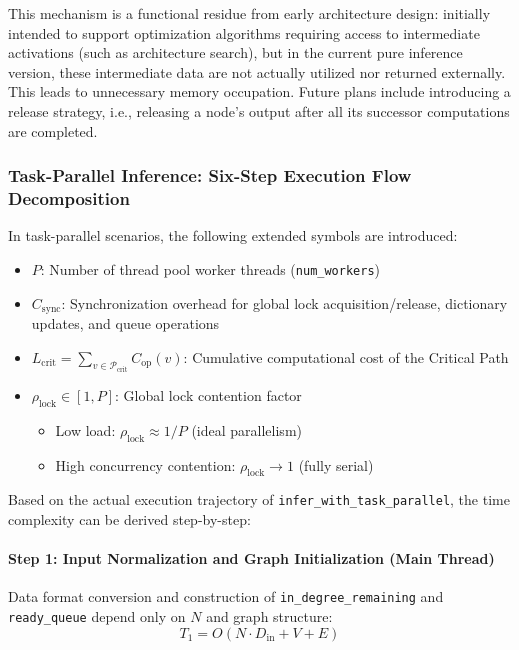 This mechanism is a functional residue from early architecture design: initially intended to support optimization algorithms requiring access to intermediate activations (such as architecture search), but in the current pure inference version, these intermediate data are not actually utilized nor returned externally. This leads to unnecessary memory occupation. Future plans include introducing a release strategy, i.e., releasing a node's output after all its successor computations are completed.

\subsubsection{Task-Parallel Inference: Six-Step Execution Flow Decomposition}

In task-parallel scenarios, the following extended symbols are introduced:
\begin{itemize}
    \item $P$: Number of thread pool worker threads (\texttt{num\_workers})
    \item $C_{\mathrm{sync}}$: Synchronization overhead for global lock acquisition/release, dictionary updates, and queue operations
    \item $L_{\mathrm{crit}} = \sum_{v \in \mathcal{P}_{\mathrm{crit}}} C_{\mathrm{op}}(v)$: Cumulative computational cost of the Critical Path
    \item $\rho_{\mathrm{lock}} \in [1, P]$: Global lock contention factor
    \begin{itemize}
        \item Low load: $\rho_{\mathrm{lock}} \approx 1/P$ (ideal parallelism)
        \item High concurrency contention: $\rho_{\mathrm{lock}} \to 1$ (fully serial)
    \end{itemize}
\end{itemize}

Based on the actual execution trajectory of \texttt{infer\_with\_task\_parallel}, the time complexity can be derived step-by-step:

\paragraph{Step 1: Input Normalization and Graph Initialization (Main Thread)}
Data format conversion and construction of \texttt{in\_degree\_remaining} and \texttt{ready\_queue} depend only on $N$ and graph structure:
\begin{equation}
    T_1 = O(N \cdot D_{\mathrm{in}} + V + E)
\end{equation}


